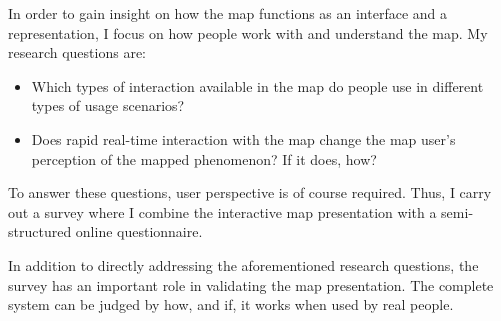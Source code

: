 

In order to gain insight on how the map functions as an interface and a representation,
I focus on how people work with and understand the map.
My research questions are:  %

\begin{itemize}
	\item Which types of interaction available in the map do people use
	in different types of usage scenarios?
	\item Does rapid real-time interaction with the map change
	the map user's perception of the mapped phenomenon? If it does, how?
\end{itemize}

To answer these questions, user perspective is of course required.
Thus, I carry out a survey
where I combine the interactive map presentation with
a semi-structured online questionnaire.

In addition to directly addressing the aforementioned research questions,
the survey has an important role in validating the map presentation.
The complete system can be judged by
how, and if, it works when used by real people.




